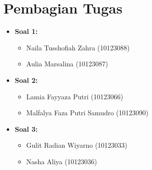 \documentclass[11pt,a4paper]{article}
\begin{document}
\section*{Pembagian Tugas}

\begin{tcolorbox}[colframe=boxheader, colback=boxbg, title=\textbf{Daftar Pembagian Tugas Anggota Kelompok}]
\begin{itemize}[leftmargin=*, label=$\blacktriangleright$]
    \item \textbf{Soal 1:}
    \begin{itemize}[leftmargin=*, label=$\circ$]
        \item Naila Tusshofiah Zahra (10123088)
        \item Aulia Marsalina (10123087)
    \end{itemize}
    \vspace{0.15cm}
    \item \textbf{Soal 2:}
    \begin{itemize}[leftmargin=*, label=$\circ$]
        \item Lamia Fayyaza Putri (10123066)
        \item Malfalya Faza Putri Samudro (10123090)
    \end{itemize}
    \vspace{0.15cm}
    \item \textbf{Soal 3:}
    \begin{itemize}[leftmargin=*, label=$\circ$]
        \item Gulit Radian Wiyarno (10123033)
        \item Nasha Aliya (10123036)
    \end{itemize}
\end{itemize}
\end{tcolorbox}
\end{document}

